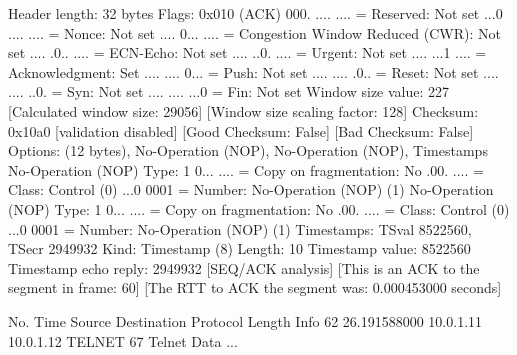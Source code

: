     Header length: 32 bytes
    Flags: 0x010 (ACK)
        000. .... .... = Reserved: Not set
        ...0 .... .... = Nonce: Not set
        .... 0... .... = Congestion Window Reduced (CWR): Not set
        .... .0.. .... = ECN-Echo: Not set
        .... ..0. .... = Urgent: Not set
        .... ...1 .... = Acknowledgment: Set
        .... .... 0... = Push: Not set
        .... .... .0.. = Reset: Not set
        .... .... ..0. = Syn: Not set
        .... .... ...0 = Fin: Not set
    Window size value: 227
    [Calculated window size: 29056]
    [Window size scaling factor: 128]
    Checksum: 0x10a0 [validation disabled]
        [Good Checksum: False]
        [Bad Checksum: False]
    Options: (12 bytes), No-Operation (NOP), No-Operation (NOP), Timestamps
        No-Operation (NOP)
            Type: 1
                0... .... = Copy on fragmentation: No
                .00. .... = Class: Control (0)
                ...0 0001 = Number: No-Operation (NOP) (1)
        No-Operation (NOP)
            Type: 1
                0... .... = Copy on fragmentation: No
                .00. .... = Class: Control (0)
                ...0 0001 = Number: No-Operation (NOP) (1)
        Timestamps: TSval 8522560, TSecr 2949932
            Kind: Timestamp (8)
            Length: 10
            Timestamp value: 8522560
            Timestamp echo reply: 2949932
    [SEQ/ACK analysis]
        [This is an ACK to the segment in frame: 60]
        [The RTT to ACK the segment was: 0.000453000 seconds]

No.     Time           Source                Destination           Protocol Length Info
     62 26.191588000   10.0.1.11             10.0.1.12             TELNET   67     Telnet Data ...

